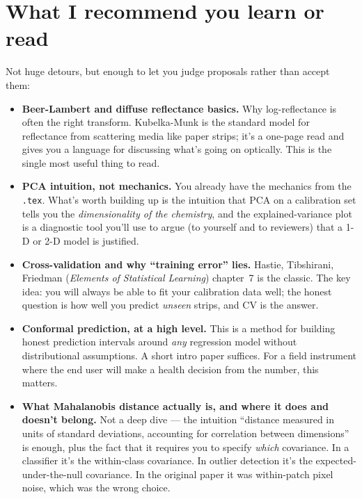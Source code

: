 \documentclass[11pt,letterpaper]{article}
\begin{document}
\section*{What I recommend you learn or read}

Not huge detours, but enough to let you judge proposals rather than accept
them:

\begin{itemize}
  \item \textbf{Beer-Lambert and diffuse reflectance basics.} Why
    log-reflectance is often the right transform. Kubelka-Munk is the
    standard model for reflectance from scattering media like paper
    strips; it's a one-page read and gives you a language for discussing
    what's going on optically. This is the single most useful thing to
    read.
  \item \textbf{PCA intuition, not mechanics.} You already have the
    mechanics from the \texttt{.tex}. What's worth building up is the
    intuition that PCA on a calibration set tells you the
    \emph{dimensionality of the chemistry}, and the explained-variance
    plot is a diagnostic tool you'll use to argue (to yourself and to
    reviewers) that a 1-D or 2-D model is justified.
  \item \textbf{Cross-validation and why ``training error'' lies.}
    Hastie, Tibshirani, Friedman (\emph{Elements of Statistical Learning})
    chapter~7 is the classic. The key idea: you will always be able to fit
    your calibration data well; the honest question is how well you predict
    \emph{unseen} strips, and CV is the answer.
  \item \textbf{Conformal prediction, at a high level.} This is a method
    for building honest prediction intervals around \emph{any} regression
    model without distributional assumptions. A short intro paper
    suffices. For a field instrument where the end user will make a
    health decision from the number, this matters.
  \item \textbf{What Mahalanobis distance actually is, and where it does
    and doesn't belong.} Not a deep dive --- the intuition ``distance
    measured in units of standard deviations, accounting for correlation
    between dimensions'' is enough, plus the fact that it requires you to
    specify \emph{which} covariance. In a classifier it's the within-class
    covariance. In outlier detection it's the expected-under-the-null
    covariance. In the original paper it was within-patch pixel noise,
    which was the wrong choice.
\end{itemize}
\end{document}
